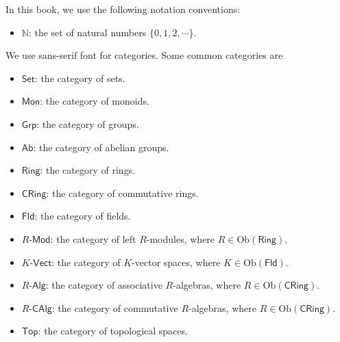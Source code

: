 \documentclass{report}
\begin{document}
In this book, we use the following notation conventions:
\begin{itemize}
    \item $\mathbb{N}$: the set of natural numbers $\{0,1,2,\cdots\}$.
\end{itemize}
We use sans-serif font for categories. Some common categories are
\begin{itemize}
    \item $\mathsf{Set}$: the category of sets.
    \item $\mathsf{Mon}$: the category of monoids.
    \item $\mathsf{Grp}$: the category of groups.
    \item $\mathsf{Ab}$: the category of abelian groups.
    \item $\mathsf{Ring}$: the category of rings.
    \item $\mathsf{CRing}$: the category of commutative rings.
    \item $\mathsf{Fld}$: the category of fields.
    \item $R\text{-}\mathsf{Mod}$: the category of left $R$-modules, where $R\in \mathrm{Ob}\left(\mathsf{Ring}\right)$.
    \item $K\text{-}\mathsf{Vect}$: the category of $K$-vector spaces, where $K\in \mathrm{Ob}\left(\mathsf{Fld}\right)$.
    \item $R\text{-}\mathsf{Alg}$: the category of associative $R$-algebras, where $R\in \mathrm{Ob}\left(\mathsf{CRing}\right)$.
    \item $R\text{-}\mathsf{CAlg}$: the category of commutative $R$-algebras, where $R\in \mathrm{Ob}\left(\mathsf{CRing}\right)$.
    \item $\mathsf{Top}$: the category of topological spaces.
\end{itemize}



















\end{document}
